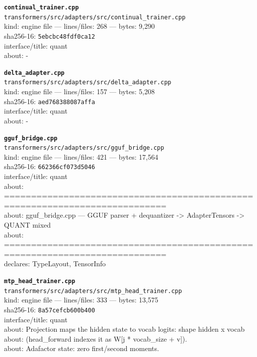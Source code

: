 \noindent\textbf{\texttt{continual\_trainer.cpp}}\\
\texttt{transformers/src/adapters/src/continual\_trainer.cpp}\\
kind: engine file --- lines/files: 268 --- bytes: 9,290\\
sha256-16: \texttt{5ebcbc48fdf0ca12}\\
interface/title: quant\\
about: -\\
\vspace*{6.0pt}
\newpage

\noindent\textbf{\texttt{delta\_adapter.cpp}}\\
\texttt{transformers/src/adapters/src/delta\_adapter.cpp}\\
kind: engine file --- lines/files: 157 --- bytes: 5,208\\
sha256-16: \texttt{aed768388087affa}\\
interface/title: quant\\
about: -\\
\vspace*{6.0pt}

\noindent\textbf{\texttt{gguf\_bridge.cpp}}\\
\texttt{transformers/src/adapters/src/gguf\_bridge.cpp}\\
kind: engine file --- lines/files: 421 --- bytes: 17,564\\
sha256-16: \texttt{662366cf073d5046}\\
interface/title: quant\\
about: ============================================================================\\
about: gguf\_bridge.cpp — GGUF parser + dequantizer -> AdapterTensors -> QUANT mixed\\
about: ============================================================================\\
declares: TypeLayout, TensorInfo\\
\vspace*{6.0pt}

\noindent\textbf{\texttt{mtp\_head\_trainer.cpp}}\\
\texttt{transformers/src/adapters/src/mtp\_head\_trainer.cpp}\\
kind: engine file --- lines/files: 333 --- bytes: 13,575\\
sha256-16: \texttt{8a57cefcb600b400}\\
interface/title: quant\\
about: Projection maps the hidden state to vocab logits: shape hidden x vocab\\
about: (head\_forward indexes it as W[j * vocab\_size + v]).\\
about: Adafactor state: zero first/second moments.\\
\vspace*{6.0pt}

